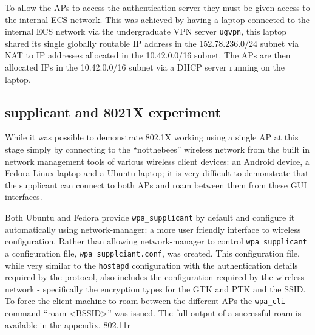 \documentclass[pdftex, 12pt, a4paper]{article}
\begin{document}

To allow the APs to access the authentication server they must be given access to the internal ECS network.  This was achieved by having a laptop connected to the internal ECS network via the undergraduate VPN server \verb`ugvpn`, this laptop shared its single globally routable IP address in the 152.78.236.0/24 subnet via NAT to IP addresses allocated in the 10.42.0.0/16 subnet.  The APs are then allocated IPs in the 10.42.0.0/16 subnet via a DHCP server running on the laptop.



\subsection{supplicant and 8021X experiment}
While it was possible to demonstrate 802.1X working using a single AP at this stage simply by connecting to the ``notthebees'' wireless network from the built in network management tools of various wireless client devices: an Android device, a Fedora Linux laptop and a Ubuntu laptop; it is very difficult to demonstrate that the supplicant can connect to both APs and roam between them from these GUI interfaces.

Both Ubuntu and Fedora provide \verb`wpa_supplicant` by default and configure it automatically using network-manager: a more user friendly interface to wireless configuration.  Rather than allowing network-manager to control \verb`wpa_supplicant` a configuration file, \verb`wpa_supplciant.conf`, was created. This configuration file, while very similar to the \verb`hostapd` configuration with the authentication details required by the protocol, also includes the configuration required by the wireless network - specifically the encryption types for the GTK and PTK and the SSID.  To force the client machine to roam between the different APs the \verb`wpa_cli` command ``roam <BSSID>'' was issued.  The full output of a successful roam is available in the appendix.
802.11r


\end{document}
